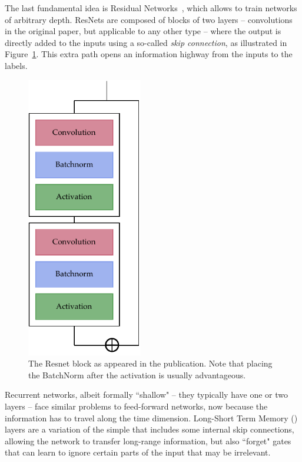 The last fundamental idea is Residual Networks~\citep{resnet}, which allows to train networks of arbitrary depth. 
ResNets are composed of blocks of two layers  -- convolutions in the original paper, but applicable to any other type -- where the output is directly added to the inputs using a so-called \emph{skip connection}, as illustrated in Figure~\ref{fig:resnet}.
This extra path opens an information highway from the inputs to the labels.

\begin{figure}[!htb]
	\centering
	\includegraphics[width=0.45\textwidth]{machine_learning/figures/resnet}
	\caption{The Resnet block as appeared in the publication.
	Note that placing the BatchNorm after the activation is usually advantageous.}\label{fig:resnet}
\end{figure}

\begin{center}
	\adfsmallleafright
\end{center}
Recurrent networks,  albeit formally ``shallow" -- they typically have one or two layers -- face similar problems 
to feed-forward networks, now because the information has to travel along the time dimension. 
Long-Short Term Memory (\LSTM) layers are a variation of the simple \RNN{} that includes some internal skip connections, allowing the network to transfer long-range information, but also ``forget" gates that can learn to ignore certain parts of the input that may be irrelevant.

